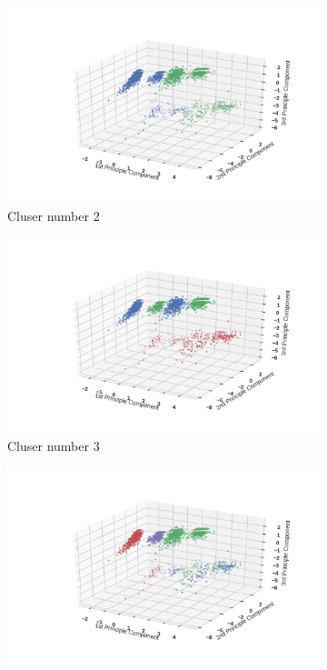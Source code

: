 \documentclass[12pt]{article}
\begin{document}
\begin{figure}
    \centering
    \begin{subfigure}[b]{0.31\textwidth}
        \includegraphics[width=\textwidth]{images/KMeans-trainbywhole-2.png}
        \caption{Cluser number 2}
        \label{fig:KMeans-trainbywhole-2}
    \end{subfigure}
    \begin{subfigure}[b]{0.31\textwidth}
        \includegraphics[width=\textwidth]{images/KMeans-trainbywhole-3.png}
        \caption{Cluser number 3}
        \label{fig:KMeans-trainbywhole-3}
    \end{subfigure}
    \begin{subfigure}[b]{0.31\textwidth}
        \includegraphics[width=\textwidth]{images/KMeans-trainbywhole-4.png}

\end{subfigure}
\end{figure}
\end{document}
